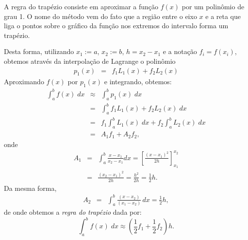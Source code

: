 A regra do trapézio consiste em aproximar a função $f(x)$ por um polinômio de grau 1. O nome do método vem do fato que a região entre o eixo $x$ e a reta que liga o pontos sobre o gráfico da função nos extremos do intervalo forma um trapézio.


Desta forma, utilizando $x_1:=a$,  $x_2:=b$, $h=x_2-x_1$ e a notação $f_i=f(x_i)$, obtemos através da interpolação de Lagrange o polinômio
\begin{eqnarray}
p_1(x) &=& f_1 L_1(x)+ f_2 L_2(x)
\end{eqnarray}
Aproximando $f(x)$ por $p_1(x)$ e integrando, obtemos:
\begin{eqnarray*}
  \int_a^bf(x)\;dx &\approx& \int_a^bp_1(x)\;dx \\
    &=& \int_a^b f_1L_1(x) + f_2L_2(x)\;dx \\
    &=& f_1 \int_a^b L_1(x)\;dx + f_2 \int_a^b L_2(x)\;dx \\
    &=& A_1 f_1 + A_2 f_2,
\end{eqnarray*}
onde
\begin{eqnarray*}
  A_1 &=& \int_a^b\frac{x-x_1}{x_2-x_1}dx =  \left[\frac{(x-x_1)^2}{2h}\right]_{x_1}^{x_2}\\
      &=& \frac{(x_2-x_1)^2}{2h} = \frac{h^2}{2h} = \frac{1}{2}h.
\end{eqnarray*}
Da mesma forma,
\begin{eqnarray*}
  A_2 &=& \int_a^b\frac{(x-x_2)}{(x_1-x_2)}\,dx = \frac{1}{2}h,
\end{eqnarray*}
de onde obtemos a \emph{regra do trapézio} dada por:
\begin{equation}
  \int_a^b f(x)\;dx \approx \left(\frac{1}{2}f_1 + \frac{1}{2}f_2\right)h.
\end{equation}


